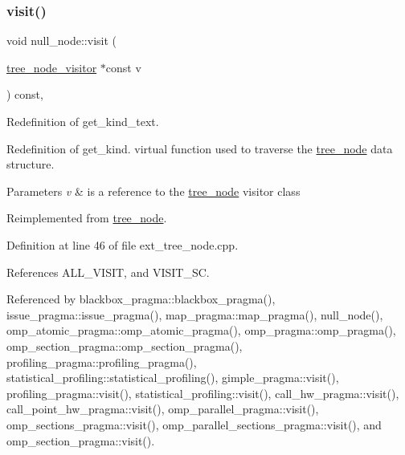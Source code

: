\subsubsection{\texorpdfstring{visit()}{visit()}}
{\footnotesize\ttfamily void null\+\_\+node\+::visit (\begin{DoxyParamCaption}\item[{\hyperlink{classtree__node__visitor}{tree\+\_\+node\+\_\+visitor} $\ast$const}]{v }\end{DoxyParamCaption}) const\hspace{0.3cm}{\ttfamily [override]}, {\ttfamily [virtual]}}



Redefinition of get\+\_\+kind\+\_\+text. 

Redefinition of get\+\_\+kind. virtual function used to traverse the \hyperlink{classtree__node}{tree\+\_\+node} data structure. 
\begin{DoxyParams}{Parameters}
{\em v} & is a reference to the \hyperlink{classtree__node}{tree\+\_\+node} visitor class \\
\hline
\end{DoxyParams}


Reimplemented from \hyperlink{classtree__node_aa9abba3f1b30e0be80b4a56b188c6ecc}{tree\+\_\+node}.



Definition at line 46 of file ext\+\_\+tree\+\_\+node.\+cpp.



References A\+L\+L\+\_\+\+V\+I\+S\+IT, and V\+I\+S\+I\+T\+\_\+\+SC.



Referenced by blackbox\+\_\+pragma\+::blackbox\+\_\+pragma(), issue\+\_\+pragma\+::issue\+\_\+pragma(), map\+\_\+pragma\+::map\+\_\+pragma(), null\+\_\+node(), omp\+\_\+atomic\+\_\+pragma\+::omp\+\_\+atomic\+\_\+pragma(), omp\+\_\+pragma\+::omp\+\_\+pragma(), omp\+\_\+section\+\_\+pragma\+::omp\+\_\+section\+\_\+pragma(), profiling\+\_\+pragma\+::profiling\+\_\+pragma(), statistical\+\_\+profiling\+::statistical\+\_\+profiling(), gimple\+\_\+pragma\+::visit(), profiling\+\_\+pragma\+::visit(), statistical\+\_\+profiling\+::visit(), call\+\_\+hw\+\_\+pragma\+::visit(), call\+\_\+point\+\_\+hw\+\_\+pragma\+::visit(), omp\+\_\+parallel\+\_\+pragma\+::visit(), omp\+\_\+sections\+\_\+pragma\+::visit(), omp\+\_\+parallel\+\_\+sections\+\_\+pragma\+::visit(), and omp\+\_\+section\+\_\+pragma\+::visit().

